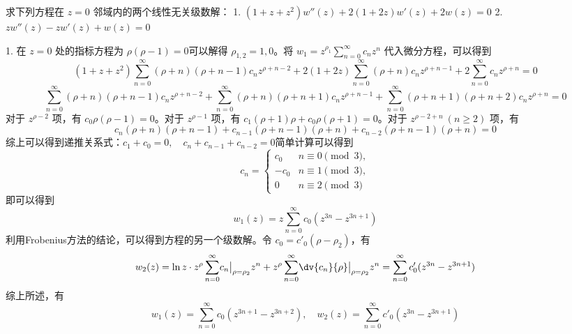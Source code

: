 \begin{question}
求下列方程在 \(z=0\) 邻域内的两个线性无关级数解：
1. \((1+z+z^2) w''(z)+2(1+2z) w'(z)+2 w(z)=0\)
2. \(z w''(z)-z w'(z)+w(z)=0\)
\begin{solution}
1. 在 \(z=0\) 处的指标方程为 \(\rho(\rho-1)=0\)可以解得 \(\rho_{1,2}=1,0\)。将 \(w_1=z^{\rho_1}\sum_{n=0}^\infty c_n z^n\) 代入微分方程，可以得到 \[ (1+z+z^2)\sum_{n=0}^\infty (\rho+n)(\rho+n-1)c_n z^{\rho+n-2}+2(1+2z)\sum_{n=0}^\infty (\rho+n)c_n z^{\rho+n-1}+2\sum_{n=0}^\infty c_n z^{\rho+n}=0 \] \[ \sum_{n=0}^\infty (\rho+n)(\rho+n-1)c_n z^{\rho+n-2}+\sum_{n=0}^\infty (\rho+n)(\rho+n+1)c_n z^{\rho+n-1}+\sum_{n=0}^\infty (\rho+n+1)(\rho+n+2)c_n z^{\rho+n}=0 \]对于 \(z^{\rho-2}\) 项，有 \(c_0\rho(\rho-1)=0\)。对于 \(z^{\rho-1}\) 项，有 \(c_1(\rho+1)\rho+c_0\rho(\rho+1)=0\)。对于 \(z^{\rho-2+n}\ (n\ge 2)\) 项，有 \[ c_n (\rho+n)(\rho+n-1)+c_{n-1}(\rho+n-1)(\rho+n)+c_{n-2}(\rho+n-1)(\rho+n)=0 \]综上可以得到递推关系式：\(c_1+c_0=0,\quad c_n+c_{n-1}+c_{n-2}=0\)简单计算可以得到 \[ c_n=\begin{cases} c_0 & n\equiv0\pmod3,\\ -c_0 & n\equiv1\pmod3,\\ 0 & n\equiv2\pmod3 \end{cases} \]即可以得到 \[ w_1(z)=z\sum_{n=0}^\infty c_0(z^{3n}-z^{3n+1}) \]利用Frobenius方法的结论，可以得到方程的另一个级数解。令 \(c_0=c'_0(\rho-\rho_2)\)，有 \[ w_2(z)=\ln z\cdot z^{\rho}\sum_{n=0}^\infty \bigl.c_n\bigr|_{\rho=\rho_2} z^n+z^{\rho}\sum_{n=0}^\infty \bigl.\dv{c_n}{\rho}\bigr|_{\rho=\rho_2}z^n =\sum_{n=0}^\infty c'_0(z^{3n}-z^{3n+1}) \]综上所述，有 \[ w_1(z)=\sum_{n=0}^\infty c_0(z^{3n+1}-z^{3n+2}),\quad w_2(z)=\sum_{n=0}^\infty c'_0(z^{3n}-z^{3n+1}) \]


\end{solution}
\end{question}
